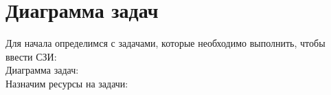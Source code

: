 \section{Диаграмма задач}
Для начала определимся с задачами,
	которые необходимо выполнить,
		чтобы ввести СЗИ:\\

Диаграмма задач:\\

\newpage
Назначим ресурсы на задачи:\\


